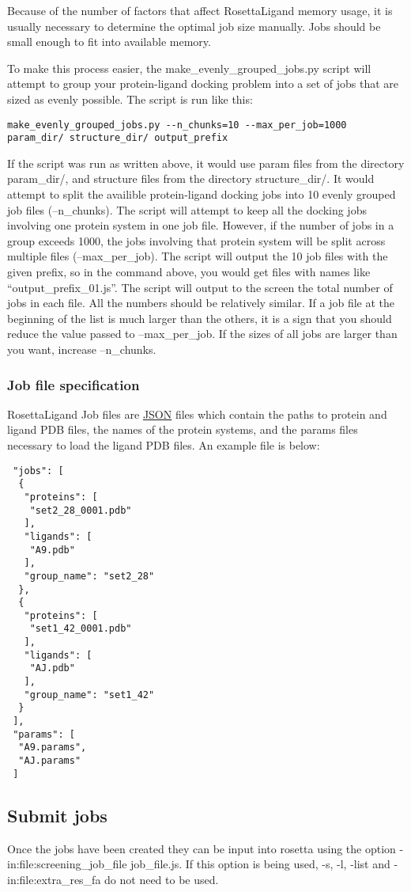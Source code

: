 Because of the number of factors that affect RosettaLigand memory usage, it is usually necessary to determine the optimal job size manually.
Jobs should be small enough to fit into available memory.

To make this process easier, the make\_evenly\_grouped\_jobs.py script will attempt to group your protein-ligand docking problem into a set of jobs that are sized as evenly possible. 
The script is run like this:

\begin{verbatim}
make_evenly_grouped_jobs.py --n_chunks=10 --max_per_job=1000 param_dir/ structure_dir/ output_prefix
\end{verbatim}

If the script was run as written above, it would use param files from the directory param\_dir/, and structure files from the directory structure\_dir/.
It would attempt to split the availible protein-ligand docking jobs into 10 evenly grouped job files (--n\_chunks).
The script will attempt to keep all the docking jobs involving one protein system in one job file. However, if the number of jobs in a group exceeds 1000,
the jobs involving that protein system will be split across multiple files (--max\_per\_job). 
The script will output the 10 job files with the given prefix, so in the command above, you would get files with names like ``output\_prefix\_01.js''.
The script will output to the screen the total number of jobs in each file. All the numbers should be relatively similar. 
If a job file at the beginning of the list is much larger than the others, it is a sign that you should reduce the value passed to --max\_per\_job. If the sizes of all jobs are larger than you want, increase --n\_chunks.

\subsubsection{Job file specification}

RosettaLigand Job files are \href{http://en.wikipedia.org/wiki/JSON}{JSON} files which contain the paths to protein and ligand PDB files, the names of the protein systems,
and the params files necessary to load the ligand PDB files.
An example file is below:

\begin{verbatim}
 "jobs": [
  {
   "proteins": [
    "set2_28_0001.pdb"
   ],
   "ligands": [
    "A9.pdb"
   ],
   "group_name": "set2_28"
  },
  {
   "proteins": [
    "set1_42_0001.pdb"
   ],
   "ligands": [
    "AJ.pdb"
   ],
   "group_name": "set1_42"
  }
 ],
 "params": [
  "A9.params",
  "AJ.params"
 ]
\end{verbatim}

\subsection{Submit jobs}

Once the jobs have been created they can be input into rosetta using the option -in:file:screening\_job\_file job\_file.js.
If this option is being used, -s, -l, -list and -in:file:extra\_res\_fa do not need to be used.
